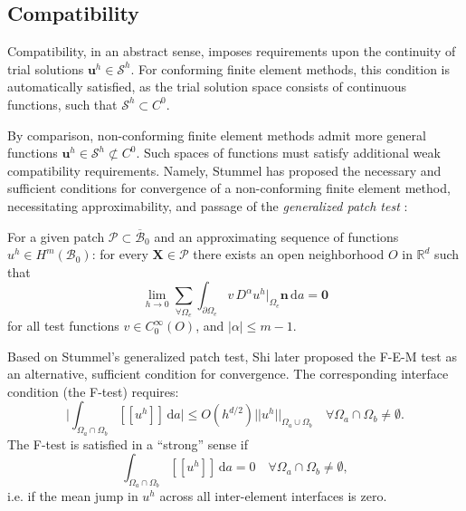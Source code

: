 	
	\subsection*{Compatibility}

	 Compatibility, in an abstract sense, imposes requirements upon the continuity of trial solutions $\bm{u}^h \in \mathcal{S}^h$. For conforming finite element methods, this condition is automatically satisfied, as the trial solution space consists of continuous functions, such that $\mathcal{S}^h \subset C^0$.

By comparison, non-conforming finite element methods admit more general functions $\bm{u}^h \in \mathcal{S}^h \not\subset C^0$. Such spaces of functions must satisfy additional weak compatibility requirements. Namely, Stummel has proposed the necessary and sufficient conditions for convergence of a non-conforming finite element method, necessitating approximability, and passage of the \textit{generalized patch test} \cite{Stummel:79}:

For a given patch $\mathcal{P} \subset \overline{\mathcal{B}}_0$ and an approximating sequence of functions $u^h \in H^m (\mathcal{B}_0)$: for every $\bm{X} \in \mathcal{P}$ there exists an open neighborhood $O$ in $\mathbb{R}^d$ such that
\begin{equation}
  \lim_{h \rightarrow 0} \sum_{\forall \Omega_e} \int_{\partial \Omega_e} v \, D^\alpha u^h|_{\Omega_e} \bm{n} \, \mathrm da = \bm{0}
\end{equation}
for all test functions $v \in C^{\infty}_0 (O)$, and $| \alpha | \leq m-1$.

	Based on Stummel's generalized patch test, Shi later proposed the F-E-M test \cite{Shi:87} as an alternative, sufficient condition for convergence. The corresponding interface condition (the F-test) requires:
	\begin{equation}
		\bigg| \int_{\Omega_a \cap \Omega_b} [\![ u^h ]\!] \, \mathrm da \bigg| \leq O(h^{d/2}) ||u^h||_{\Omega_a \cup \Omega_b} \quad \forall \Omega_a \cap \Omega_b \neq \emptyset.
	\end{equation}
	The F-test is satisfied in a ``strong'' sense if
	\begin{equation}
		\int_{\Omega_a \cap \Omega_b} [\![ u^h ]\!] \, \mathrm da = 0 \quad \forall \Omega_a \cap \Omega_b \neq \emptyset,
	\end{equation}
	i.e. if the mean jump in $u^h$ across all inter-element interfaces is zero.
	
